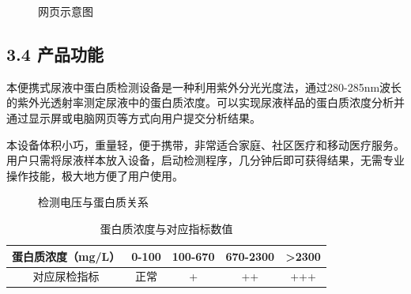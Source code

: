 \documentclass[a4paper,12pt]{article}
\begin{document}
\begin{figure}[H]
    \centering
    \caption{网页示意图}
\end{figure}

\subsection*{3.4 产品功能}
本便携式尿液中蛋白质检测设备是一种利用紫外分光光度法，通过280-285nm波长的紫外光透射率测定尿液中的蛋白质浓度。可以实现尿液样品的蛋白质浓度分析并通过显示屏或电脑网页等方式向用户提交分析结果。

本设备体积小巧，重量轻，便于携带，非常适合家庭、社区医疗和移动医疗服务。用户只需将尿液样本放入设备，启动检测程序，几分钟后即可获得结果，无需专业操作技能，极大地方便了用户使用。

\begin{figure}[H]
    \centering
    \caption{检测电压与蛋白质关系}
\end{figure}

\begin{table}[H]
    \centering
    \caption{蛋白质浓度与对应指标数值}
    \renewcommand{\arraystretch}{1.2}
    \begin{tabular}{|c|c|c|c|c|}
    \hline
    蛋白质浓度（mg/L） & 0-100 & 100-670 & 670-2300 & >2300 \\
    \hline
    对应尿检指标 & 正常 & + & ++ & +++ \\
    \hline
    \end{tabular}
\end{table}
\end{document}
